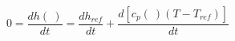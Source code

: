 \begin{equation}
0= \frac{dh(\ )}{dt} = \frac{dh_{ref}}{dt}+ \frac{d [c_p(\ ) (T- T_{ref})]}{dt} 
\end{equation}
